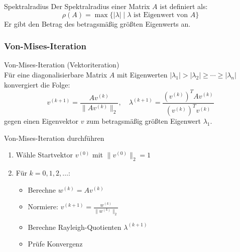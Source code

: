 \begin{definition}{Spektralradius}
Der Spektralradius einer Matrix $A$ ist definiert als:
$$\rho(A) = \max\{|\lambda| \mid \lambda \text{ ist Eigenwert von } A\}$$
Er gibt den Betrag des betragsmäßig größten Eigenwerts an.
\end{definition}

\subsubsection{Von-Mises-Iteration}

\begin{concept}{Von-Mises-Iteration (Vektoriteration)}\\
Für eine diagonalisierbare Matrix $A$ mit Eigenwerten $|\lambda_1| > |\lambda_2| \geq \cdots \geq |\lambda_n|$ konvergiert die Folge:
$$v^{(k+1)} = \frac{Av^{(k)}}{\|Av^{(k)}\|_2}, \quad
\lambda^{(k+1)} = \frac{(v^{(k)})^TAv^{(k)}}{(v^{(k)})^Tv^{(k)}}$$
gegen einen Eigenvektor $v$ zum betragsmäßig größten Eigenwert $\lambda_1$.
\end{concept}

\begin{KR}{Von-Mises-Iteration durchführen}
\begin{enumerate}
    \item Wähle Startvektor $v^{(0)}$ mit $\|v^{(0)}\|_2 = 1$
    \item Für $k = 0,1,2,\ldots$:
    \begin{itemize}
        \item Berechne $w^{(k)} = Av^{(k)}$
        \item Normiere: $v^{(k+1)} = \frac{w^{(k)}}{\|w^{(k)}\|_2}$
        \item Berechne Rayleigh-Quotienten $\lambda^{(k+1)}$
        \item Prüfe Konvergenz
    \end{itemize}
\end{enumerate}
\end{KR}

